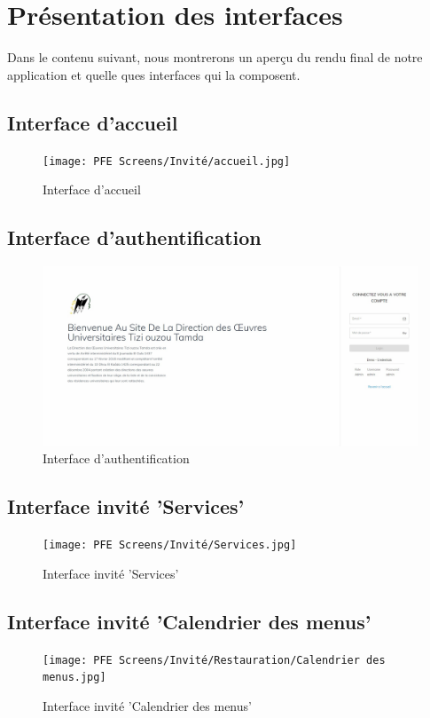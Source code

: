 \section{Présentation des interfaces}
    Dans le contenu suivant, nous montrerons un aperçu du rendu final de notre application et quelle ques interfaces qui la composent.

    \subsection{Interface d'accueil}
    \begin{figure}[H]
        \centering
        \texttt{[image: PFE Screens/Invité/accueil.jpg]}
        \caption{Interface d'accueil}
    \end{figure}

    \subsection{Interface d'authentification}
    \begin{figure}[H]
        \centering
        \includegraphics[scale=0.21]{PFE Screens/Connection.jpg}
        \caption{Interface d'authentification}
    \end{figure}

    \subsection{Interface invité 'Services'}
    \begin{figure}[H]
        \centering
        \texttt{[image: PFE Screens/Invité/Services.jpg]}
        \caption{Interface invité 'Services'}
    \end{figure}

    \subsection{Interface invité 'Calendrier des menus'}
    \begin{figure}[H]
        \centering
        \texttt{[image: PFE Screens/Invité/Restauration/Calendrier des menus.jpg]}
        \caption{Interface invité 'Calendrier des menus'}
    \end{figure}

